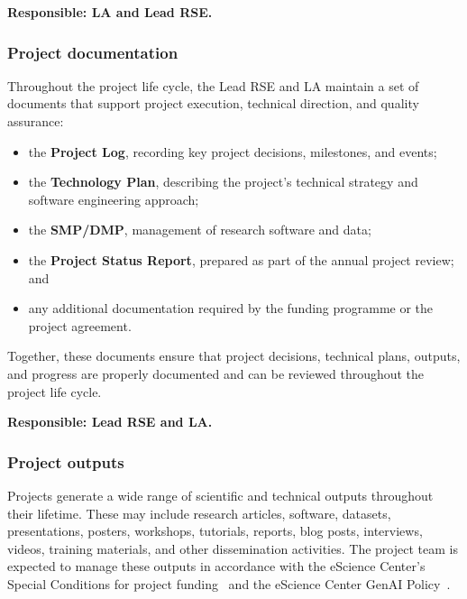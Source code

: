 \textbf{Responsible: LA and Lead RSE.}

\subsubsection{Project documentation}
\label{sec:exec:documentation}
Throughout the project life cycle, the Lead RSE and LA maintain a set of documents that support project execution, 
technical direction, and quality assurance: 
\vspace{-0.2cm}
\begin{itemize}
\item the \textbf{Project Log}, recording key project decisions, milestones, and events;
\item the \textbf{Technology Plan}, describing the project's technical strategy and software engineering approach;
\item the \textbf{SMP/DMP}, management of research software and data;
\item the \textbf{Project Status Report}, prepared as part of the annual project review; and
\item any additional documentation required by the funding programme or the project agreement.
\end{itemize}
\vspace{-0.2cm}

Together, these documents ensure that project decisions, technical plans, outputs, and progress are properly documented 
and can be reviewed throughout the project life cycle.

\textbf{Responsible: Lead RSE and LA.}

\subsubsection{Project outputs}
\label{sec:exec:output}
Projects generate a wide range of scientific and technical outputs throughout their lifetime. These may include
research articles, software, datasets, presentations, posters, workshops, tutorials, reports, blog posts, interviews,
videos, training materials, and other dissemination activities. The project team is expected to manage these outputs in
accordance with the eScience Center's Special Conditions for project funding~\cite{nlesc-terms} and the eScience Center 
GenAI Policy~\cite{nlesc2023genai}. 


